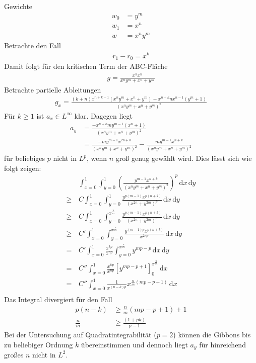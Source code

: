 \documentclass[10pt,a4paper,oneside]{report}
\begin{document}
Gewichte
\begin{align*}
w_0 &= y^m \\
w_1 &= x^n \\
w &= x^n y^m
\end{align*}
Betrachte den Fall
\begin{align*}
r_1 - r_0 = x^k
\end{align*}
Damit folgt für den kritischen Term der ABC-Fläche
\begin{align*}
g = \frac{x^k x^n}{x^n y^m + x^n + y^m}
\end{align*}
Betrachte partielle Ableitungen
\begin{align*}
g_x = \frac{\left(k+n\right) x^{n+k-1} \left( x^ny^m+x^n+y^m\right) - x^{n+k} n x^{n-1} \left(y^m + 1\right)}{\left(x^ny^m+x^n+y^m\right)^2}
\end{align*}
Für $k \geq 1$ ist $a_x \in L^{\infty}$ klar.
Dagegen liegt 
\begin{align*}
a_y &= \frac{-x^{n+k} m y^{m-1} \left(x^n + 1\right)}{\left(x^ny^m+x^n+y^m\right)^2} \\
&=  \frac{-my^{m-1}x^{2n+k}}{\left(x^ny^m+x^n+y^m\right)^2} - \frac{my^{m-1}x^{n+k}}{\left(x^ny^m+x^n+y^m\right)^2}
\end{align*}
für beliebiges $p$ nicht in $L^p$, wenn $n$ groß genug gewählt wird.
Dies lässt sich wie folgt zeigen: 
\begin{align*}
&\int_{x=0}^{1} \int_{y=0}^{1} \left( \frac{y^{m-1}x^{n+k}}{\left(x^ny^m+x^n+y^m\right)^2} \right)^p \, \mathrm{d}x \, \mathrm{d}y \\
\geq \, &C \int_{x=0}^{1} \int_{y=0}^{1}  \frac{y^{p\left(m-1\right)}x^{p\left(n+k\right)}}{\left(x^{2n}+y^{2m}\right)^p}  \, \mathrm{d}x \, \mathrm{d}y \\
\geq \, &C \int_{x=0}^{1} \int_{y=0}^{x^{\frac{n}{m}}}  \frac{y^{p\left(m-1\right)}x^{p\left(n+k\right)}}{\left(x^{2n}+y^{2m}\right)^p}  \, \mathrm{d}x \, \mathrm{d}y \\
\geq \, &C' \int_{x=0}^{1} \int_{y=0}^{x^{\frac{n}{m}}}  \frac{y^{\left(m-1\right)p}x^{p\left(n+k\right)}}{x^{2np}}  \, \mathrm{d}x \, \mathrm{d}y \\
= \, &C' \int_{x=0}^{1} \frac{x^{kp}}{x^{np}} \int_{y=0}^{x^{\frac{n}{m}}} y^{mp-p}  \, \mathrm{d}x \, \mathrm{d}y \\
= \, &C'' \int_{x=0}^{1} \frac{x^{kp}}{x^{np}} \left[y^{mp-p+1}\right]_{0}^{x^{\frac{n}{m}}} \, \mathrm{d}x\\
= \, &C'' \int_{x=0}^{1} \frac{1}{x^{\left(n-k\right)p}} x^{\frac{n}{m}\left(mp-p+1\right)} \, \mathrm{d}x\\
\end{align*}
Das Integral divergiert für den Fall
\begin{align*}
p \left(n - k\right) &\geq \frac{n}{m}\left(mp-p+1\right) + 1 \\
\frac{n}{m} &\geq \frac{\left(1+pk\right)}{p-1}
\end{align*}
Bei der Untersuchung auf Quadratintegrabilität ($p=2$) können die Gibbons bis zu beliebiger Ordnung $k$ übereinstimmen und dennoch liegt $a_y$ für hinreichend großes $n$ nicht in $L^2$.
\end{document}
